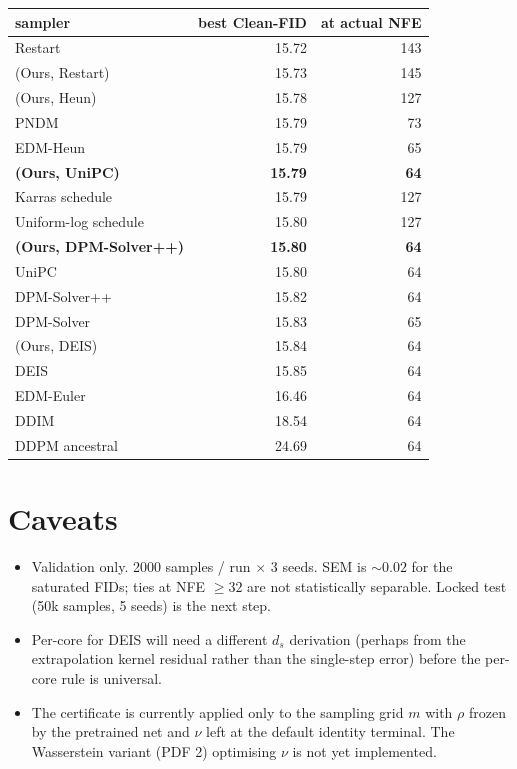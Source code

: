 \documentclass[11pt]{article}
\begin{document}
\begin{center}
\small
\begin{tabular}{l r r}
\toprule
sampler & best Clean-FID & at actual NFE \\
\midrule
Restart                & 15.72 & 143 \\
(Ours, Restart)        & 15.73 & 145 \\
(Ours, Heun)           & 15.78 & 127 \\
PNDM                   & 15.79 &  73 \\
EDM-Heun               & 15.79 &  65 \\
\textbf{(Ours, UniPC)} & \textbf{15.79} & \textbf{64} \\
Karras schedule        & 15.79 & 127 \\
Uniform-log schedule   & 15.80 & 127 \\
\textbf{(Ours, DPM-Solver++)} & \textbf{15.80} & \textbf{64} \\
UniPC                  & 15.80 & 64 \\
DPM-Solver++           & 15.82 & 64 \\
DPM-Solver             & 15.83 & 65 \\
(Ours, DEIS)           & 15.84 & 64 \\
DEIS                   & 15.85 & 64 \\
EDM-Euler              & 16.46 & 64 \\
DDIM                   & 18.54 & 64 \\
DDPM ancestral         & 24.69 & 64 \\
\bottomrule
\end{tabular}
\end{center}

\section{Caveats}

\begin{itemize}
\item Validation only. 2000 samples / run $\times$ 3 seeds. SEM is $\sim 0.02$ for the saturated FIDs; ties at NFE $\geq 32$ are not statistically separable. Locked test (50k samples, 5 seeds) is the next step.
\item Per-core for DEIS will need a different $d_s$ derivation (perhaps from the extrapolation kernel residual rather than the single-step error) before the per-core rule is universal.
\item The certificate is currently applied only to the sampling grid $m$ with $\rho$ frozen by the pretrained net and $\nu$ left at the default identity terminal. The Wasserstein variant (PDF 2) optimising $\nu$ is not yet implemented.
\end{itemize}
\end{document}
